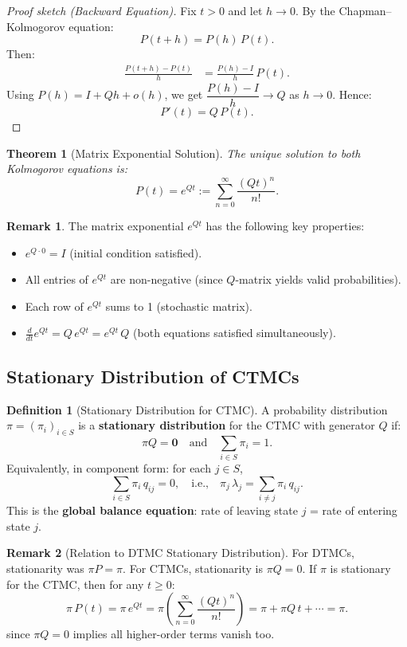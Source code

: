 \documentclass[12pt, a4paper]{article}
\theoremstyle{definition}
\newtheorem{definition}{Definition}[section]
\newtheorem{remark}{Remark}[section]
\theoremstyle{plain}
\newtheorem{theorem}{Theorem}[section]
\begin{document}
\begin{proof}[Proof sketch (Backward Equation)]
Fix $t>0$ and let $h\to 0$. By the Chapman–Kolmogorov equation:
\[
  P(t+h) = P(h)\,P(t).
\]
Then:
\begin{align*}
  \frac{P(t+h)-P(t)}{h} &= \frac{P(h)-I}{h}\,P(t).
\end{align*}
Using $P(h) = I + Qh + o(h)$, we get $\dfrac{P(h)-I}{h} \to Q$ as $h\to 0$. Hence:
\[
  P'(t) = Q\,P(t).
\]
\end{proof}

\begin{theorem}[Matrix Exponential Solution]
The unique solution to both Kolmogorov equations is:
\[
  P(t) = e^{Qt} := \sum_{n=0}^{\infty} \frac{(Qt)^n}{n!}.
\]
\end{theorem}

\begin{remark}
The matrix exponential $e^{Qt}$ has the following key properties:
\begin{itemize}
  \item $e^{Q\cdot 0} = I$ (initial condition satisfied).
  \item All entries of $e^{Qt}$ are non-negative (since $Q$-matrix yields valid probabilities).
  \item Each row of $e^{Qt}$ sums to 1 (stochastic matrix).
  \item $\frac{d}{dt}e^{Qt} = Q\,e^{Qt} = e^{Qt}\,Q$ (both equations satisfied simultaneously).
\end{itemize}
\end{remark}

\subsection{Stationary Distribution of CTMCs}

\begin{definition}[Stationary Distribution for CTMC]
A probability distribution $\pi = (\pi_i)_{i\in S}$ is a \textbf{stationary distribution} for the CTMC with generator $Q$ if:
\[
  \pi Q = \mathbf{0} \quad \text{and} \quad \sum_{i\in S} \pi_i = 1.
\]
Equivalently, in component form: for each $j\in S$,
\[
  \sum_{i\in S} \pi_i\,q_{ij} = 0, \quad \text{i.e.,} \quad \pi_j\,\lambda_j = \sum_{i\ne j} \pi_i\,q_{ij}.
\]
This is the \textbf{global balance equation}: rate of leaving state $j$ = rate of entering state $j$.
\end{definition}

\begin{remark}[Relation to DTMC Stationary Distribution]
For DTMCs, stationarity was $\pi P = \pi$. For CTMCs, stationarity is $\pi Q = 0$. If $\pi$ is stationary for the CTMC, then for any $t\ge 0$:
\[
  \pi\,P(t) = \pi\,e^{Qt} = \pi\left(\sum_{n=0}^\infty \frac{(Qt)^n}{n!}\right) = \pi + \pi Q\,t + \cdots = \pi.
\]
since $\pi Q = 0$ implies all higher-order terms vanish too.
\end{remark}
\end{document}
